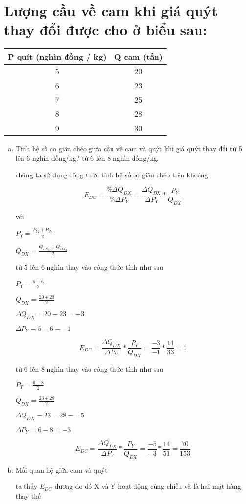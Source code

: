 \section{ Lượng cầu về cam khi giá quýt thay đổi được cho ở biểu sau:}

\begin{tabular}{|c|c|}
  \hline
  P quít (nghìn đồng / kg) & Q cam (tấn) \\
  \hline
  5                        & 20          \\
  \hline
  6                        & 23          \\
  \hline
  7                        & 25          \\
  \hline
  8                        & 28          \\
  \hline
  9                        & 30          \\
  \hline
\end{tabular}

\begin{enumerate}[a.]
  \item Tính hệ số co giãn chéo giữa cầu về cam và quýt khi giá quýt thay đổi từ 5 lên 6 nghìn
        đồng/kg? từ 6 lên 8 nghìn đồng/kg.

        chúng ta sử dụng công thức tính hệ số co giãn chéo trên khoảng

        \[ E_{DC} = \frac{\% \Delta Q_{DX}}{\% \Delta P_{Y}}
          =  \frac{ \Delta Q_{DX}}{\Delta P_{Y}} * \frac{P_{Y}}{Q_{DX}} \]

        với

        $P_{Y} = \frac{P_{Y_1} + P_{Y_2}}{2}$

        $Q_{DX} = \frac{Q_{DX_1} + Q_{DX_2}}{2}$

        từ 5 lên 6 nghìn
        thay vào công thức tính như sau

        $P_{Y} = \frac{5 +6 }{2}$

        $Q_{DX} = \frac{20 + 23}{2}$

        $\Delta Q_{DX} = 20 -23 = -3$

        $\Delta P_{Y} = 5 -6 = -1$

        \[ E_{DC} = \frac{ \Delta Q_{DX}}{\Delta P_{Y}} * \frac{P_{Y}}{Q_{DX}}
          = \frac{-3}{-1} * \frac{11}{33} = 1 \]


        từ 6 lên 8 nghìn
        thay vào công thức tính như sau

        $P_{Y} = \frac{6 + 8 }{2}$

        $Q_{DX} = \frac{23 + 28}{2}$

        $\Delta Q_{DX} = 23 -28 = -5$

        $\Delta P_{Y} = 6 - 8 = -3$

        \[ E_{DC} = \frac{ \Delta Q_{DX}}{\Delta P_{Y}} * \frac{P_{Y}}{Q_{DX}}
          = \frac{-5}{-3} * \frac{14}{51} = \frac{70}{153} \]


  \item Mối quan hệ giữa cam và quýt

        ta thấy $E_{DC}$ dương do đó X và Y hoạt động cùng chiều và là hai mặt hàng thay thế
\end{enumerate}

